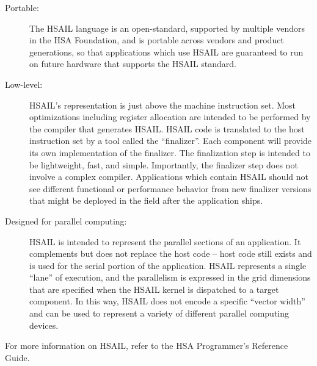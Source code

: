 \documentclass{book}
\begin{document}
\begin{description}
\item[Portable:] The HSAIL language is an open-standard, supported by
multiple vendors in the HSA Foundation, and is portable across
vendors and product generations, so that applications which use
HSAIL are guaranteed to run on future hardware that supports the
HSAIL standard.
\item[Low-level:] HSAIL’s representation is just above the machine
instruction set.  Most optimizations including register allocation
are intended to be performed by the compiler that generates HSAIL.
HSAIL code is translated to the host instruction set by a tool
called the “finalizer”.  Each component will provide its own
implementation of the finalizer.  The finalization step is intended
to be lightweight, fast, and simple.  Importantly, the finalizer
step does not involve a complex compiler.  Applications which
contain HSAIL should not see different functional or performance
behavior from new finalizer versions that might be deployed in the
field after the application ships.
\item[Designed for parallel computing:] HSAIL is intended to represent
the parallel sections of an application.  It complements but does
not replace the host code – host code still exists and is used for
the serial portion of the application.  HSAIL represents a single
“lane” of execution, and the parallelism is expressed in the grid
dimensions that are specified when the HSAIL kernel is dispatched to
a target component.  In this way, HSAIL does not encode a specific
“vector width” and can be used to represent a variety of different
parallel computing devices.
\end{description}

For more information on HSAIL, refer to the HSA Programmer’s
Reference Guide.
\end{document}

